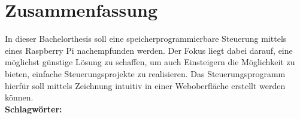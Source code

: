 \thispagestyle{empty}
\section*{Zusammenfassung}
In dieser Bachelorthesis soll eine speicherprogrammierbare Steuerung mittels eines Raspberry Pi nachempfunden werden. Der Fokus liegt dabei darauf, eine möglichst günstige Lösung zu schaffen, um auch Einsteigern die Möglichkeit zu bieten, einfache Steuerungsprojekte zu realisieren. Das Steuerungsprogramm hierfür soll mittels Zeichnung intuitiv in einer Weboberfläche erstellt werden können.
\\[0.5cm]
\textbf{Schlagwörter:} \keywords
